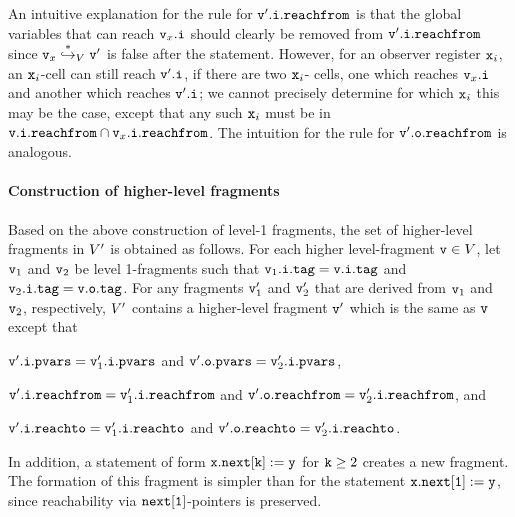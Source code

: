 \begin{enumerate}
\begin{itemize}
  An intuitive explanation for the rule for $\mathtt{v}'.\mathtt{i}.\mathtt{reachfrom}$
  is that the global variables that
  can reach $\mathtt{v}_x.\mathtt{i}$ should clearly be removed from $\mathtt{v}'.\mathtt{i}.\mathtt{reachfrom}$ since $\mathtt{v}_x \overset{*}\hookrightarrow_{V} \mathtt{v}'$ is false
  after the statement. However, for an observer register $\mathtt{x}_i$, an
  $\mathtt{x}_i$-cell can still reach $\mathtt{v}'.\mathtt{i}$, if there are two $\mathtt{x}_i$-
  cells, one which reaches $\mathtt{v}_x.\mathtt{i}$ and another which reaches
  $\mathtt{v}'.\mathtt{i}$; we cannot precisely determine for which $\mathtt{x}_i$ this
  may be the case, except that any such $\mathtt{x}_i$ must be in
  $\mathtt{v}.\mathtt{i}.\mathtt{reachfrom} \cap \mathtt{v}_x.\mathtt{i}.\mathtt{reachfrom}$.
  The intuition for the rule for $\mathtt{v}'.\mathtt{o}.\mathtt{reachfrom}$ is analogous.
\end{itemize}
\end{enumerate}

\paragraph{{\bf Construction of higher-level fragments}}
Based on the above construction of level-1 fragments, the set of
higher-level fragments in $V'$ is obtained as follows.
     For each higher level-fragment $\mathtt{v} \in V$, let 
     $\mathtt{v}_1$ and $\mathtt{v}_2$ be level 1-fragments such that
     $\mathtt{v}_1.\mathtt{i}.\mathtt{tag} = \mathtt{v}.\mathtt{i}.\mathtt{tag}$ and
     $\mathtt{v}_2.\mathtt{i}.\mathtt{tag} = \mathtt{v}.\mathtt{o}.\mathtt{tag}$.
     For any fragments $\mathtt{v}_1'$ and $\mathtt{v}_2'$ that are derived from
     $\mathtt{v}_1$ and $\mathtt{v}_2$, respectively, $V'$ contains a higher-level
     fragment $\mathtt{v}'$ which is the same as $\mathtt{v}$ except that 
\begin{inparaenum}[(i)]
\item $\mathtt{v}'.\mathtt{i}.\mathtt{pvars} = \mathtt{v}_1'.\mathtt{i}.\mathtt{pvars}$ and
$\mathtt{v}'.\mathtt{o}.\mathtt{pvars} = \mathtt{v}_2'.\mathtt{i}.\mathtt{pvars}$,
\item $\mathtt{v}'.\mathtt{i}.\mathtt{reachfrom} = \mathtt{v}_1'.\mathtt{i}.\mathtt{reachfrom}$ and
$\mathtt{v}'.\mathtt{o}.\mathtt{reachfrom} = \mathtt{v}_2'.\mathtt{i}.\mathtt{reachfrom}$,
  and
\item $\mathtt{v}'.\mathtt{i}.\mathtt{reachto} = \mathtt{v}_1'.\mathtt{i}.\mathtt{reachto}$ and
$\mathtt{v}'.\mathtt{o}.\mathtt{reachto} =  \mathtt{v}_2'.\mathtt{i}.\mathtt{reachto}$.
\end{inparaenum}
In addition, a statement of form ${\tt x.next[k] := y}$ for ${\tt k} \geq 2$
creates a new fragment. The formation of this fragment is simpler than
for the statement ${\tt x.next[1] := y}$, since reachability via
$\tt next[1]$-pointers is preserved.


